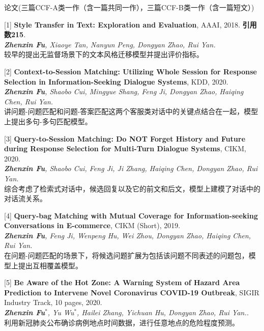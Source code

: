 \documentclass{resume} %
\begin{document}
\vspace{-0.2cm}
\begin{rSection}{论文(三篇CCF-A类一作（含一篇共同一作），三篇CCF-B类一作（含一篇短文）)}

    [1] \textbf{Style Transfer in Text: Exploration and Evaluation}, AAAI, 2018. \textbf{引用数215}.\\
    {\it \textbf{Zhenxin Fu}, Xiaoye Tan, Nanyun Peng, Dongyan Zhao, Rui Yan.} \\
    较早的提出无监督场景下的文本风格迁移模型并提出评价指标。
    \vspace{-0.1cm}
  
    [2] \textbf{Context-to-Session Matching: Utilizing Whole Session for Response Selection in Information-Seeking Dialogue Systems}, KDD, 2020. \\
    {\it \textbf{Zhenxin Fu}, Shaobo Cui, Mingyue Shang, Feng Ji, Dongyan Zhao, Haiqing Chen, Rui Yan.} \\
    讲问题-问题匹配和问题-答案匹配这两个客服类对话中的关键点结合在一起，模型上提出多句-多句匹配模型。
    \vspace{-0.1cm}

    [3] \textbf{Query-to-Session Matching: Do NOT Forget History and Future during Response Selection for Multi-Turn Dialogue Systems}, CIKM, 2020. \\
    {\it \textbf{Zhenxin Fu}, Shaobo Cui, Feng Ji, Ji Zhang, Haiqing Chen, Dongyan Zhao, Rui Yan.}\\
    综合考虑了检索式对话中，候选回复以及它的前文和后文，模型上建模了对话中的对话流关系。
    \vspace{-0.1cm}
    
    [4] \textbf{Query-bag Matching with Mutual Coverage for Information-seeking Conversations in E-commerce}, CIKM (Short), 2019. \\
    {\it \textbf{Zhenxin Fu}, Feng Ji, Wenpeng Hu, Wei Zhou, Dongyan Zhao, Haiqing Chen, Rui Yan.}\\
    在问题-问题匹配的场景下，将候选问题扩展为包括该问题不同表述的问题包，模型上提出互相覆盖模型。
    \vspace{-0.1cm}

    [5] \textbf{Be Aware of the Hot Zone: A Warning System of Hazard Area Prediction to Intervene Novel Coronavirus COVID-19 Outbreak}, SIGIR Industry Track, 10 pages, 2020. \\
    {\it \textbf{Zhenxin Fu}$^*$, Yu Wu$^*$, Hailei Zhang, Yichuan Hu, Dongyan Zhao, Rui Yan..}\\
    利用新冠肺炎公布确诊病例地点时间数据，进行任意地点的危险程度预测。
    \vspace{-0.1cm}


\end{rSection}
\end{document}

